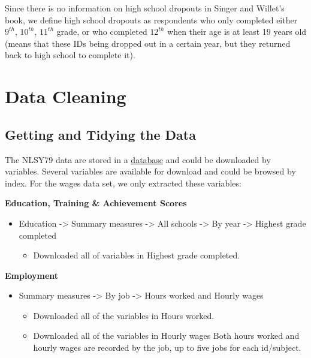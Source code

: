 \documentclass{article}
\begin{document}
Since there is no information on high school dropouts in Singer and Willet's book, we define high school dropouts as respondents who only completed either \(9^{th}\), \(10^{th}\), \(11^{th}\) grade, or who completed \(12^{th}\) when their age is at least 19 years old (means that these IDs being dropped out in a certain year, but they returned back to high school to complete it).

\hypertarget{cleaning}{%
\section{Data Cleaning}\label{cleaning}}

\hypertarget{getting-and-tidying-the-data}{%
\subsection{Getting and Tidying the Data}\label{getting-and-tidying-the-data}}

The NLSY79 data are stored in a \href{https://www.nlsinfo.org/content/cohorts/nlsy79/get-data}{database} and could be downloaded by variables. Several variables are available for download and could be browsed by index. For the wages data set, we only extracted these variables:

\textbf{Education, Training \& Achievement Scores}

\begin{itemize}
\tightlist
\item
  Education -\textgreater{} Summary measures -\textgreater{} All schools -\textgreater{} By year -\textgreater{} Highest grade completed

  \begin{itemize}
  \tightlist
  \item
    Downloaded all of variables in Highest grade completed.
  \end{itemize}
\end{itemize}

\textbf{Employment}

\begin{itemize}
\tightlist
\item
  Summary measures -\textgreater{} By job -\textgreater{} Hours worked and Hourly wages

  \begin{itemize}
  \tightlist
  \item
    Downloaded all of the variables in Hours worked.
  \item
    Downloaded all of the variables in Hourly wages
    Both hours worked and hourly wages are recorded by the job, up to five jobs for each id/subject.
  \end{itemize}
\end{itemize}
\end{document}
